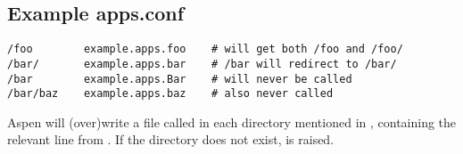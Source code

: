 \subsection{Example apps.conf \label{apps.conf}}

\begin{verbatim}
/foo        example.apps.foo    # will get both /foo and /foo/
/bar/       example.apps.bar    # /bar will redirect to /bar/
/bar        example.apps.Bar    # will never be called
/bar/baz    example.apps.baz    # also never called
\end{verbatim}

Aspen will (over)write a file called  in each directory
mentioned in , containing the relevant line from
. If the directory does not exist,  is
raised.

